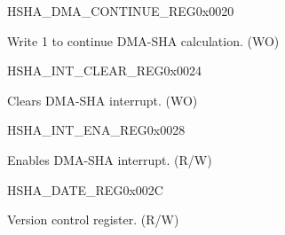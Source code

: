 \begin{register}{H}{SHA\_DMA\_CONTINUE\_REG}{0x0020}\label{regdesc:SHADMACONTINUEREG}
%
%
\regnewline%
\begin{regdesc}\begin{reglist}
\label{fielddesc:SHADMACONTINUE}\item [SHA\_DMA\_CONTINUE] Write 1 to continue DMA-SHA calculation. (WO)
\end{reglist}\end{regdesc}
\end{register}


\begin{register}{H}{SHA\_INT\_CLEAR\_REG}{0x0024}\label{regdesc:SHAINTCLEARREG}
%
%
\regnewline%
\begin{regdesc}\begin{reglist}
\label{fielddesc:SHACLEARINTERRUPT}\item [SHA\_CLEAR\_INTERRUPT] Clears DMA-SHA interrupt. (WO)
\end{reglist}\end{regdesc}
\end{register}


\begin{register}{H}{SHA\_INT\_ENA\_REG}{0x0028}\label{regdesc:SHAINTENAREG}
%
%
\regnewline%
\begin{regdesc}\begin{reglist}
\label{fielddesc:SHAINTERRUPTENA}\item [SHA\_INTERRUPT\_ENA] Enables DMA-SHA interrupt. (R/W)
\end{reglist}\end{regdesc}
\end{register}


\begin{register}{H}{SHA\_DATE\_REG}{0x002C}\label{regdesc:SHADATEREG}
%
%
\regnewline%
\begin{regdesc}\begin{reglist}
\label{fielddesc:SHADATE}\item [SHA\_DATE] Version control register. (R/W)
\end{reglist}\end{regdesc}
\end{register}


